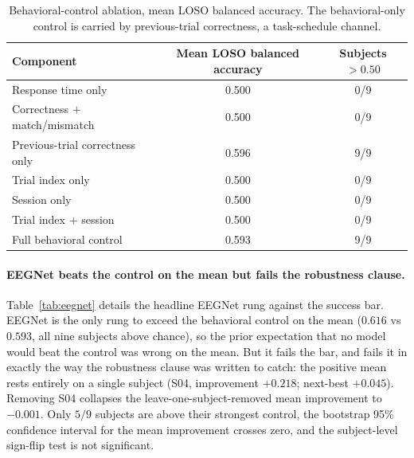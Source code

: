 \documentclass[11pt]{article}
\begin{document}
\begin{table}[h]
\centering
\caption{Behavioral-control ablation, mean LOSO balanced accuracy. The behavioral-only control is
carried by previous-trial correctness, a task-schedule channel.}
\label{tab:behavior}
\begin{tabular}{lcc}
\toprule
Component & Mean LOSO balanced accuracy & Subjects $>0.50$ \\
\midrule
Response time only & 0.500 & 0/9 \\
Correctness $+$ match/mismatch & 0.500 & 0/9 \\
Previous-trial correctness only & 0.596 & 9/9 \\
Trial index only & 0.500 & 0/9 \\
Session only & 0.500 & 0/9 \\
Trial index $+$ session & 0.500 & 0/9 \\
Full behavioral control & 0.593 & 9/9 \\
\bottomrule
\end{tabular}
\end{table}

\paragraph{EEGNet beats the control on the mean but fails the robustness clause.}
Table~\ref{tab:eegnet} details the headline EEGNet rung against the success bar. EEGNet is the only
rung to exceed the behavioral control on the mean ($0.616$ vs $0.593$, all nine subjects above
chance), so the prior expectation that no model would beat the control was wrong on the mean. But it
fails the bar, and fails it in exactly the way the robustness clause was written to catch: the
positive mean rests entirely on a single subject (S04, improvement $+0.218$; next-best $+0.045$).
Removing S04 collapses the leave-one-subject-removed mean improvement to $-0.001$. Only $5/9$
subjects are above their strongest control, the bootstrap 95\% confidence interval for the mean
improvement crosses zero, and the subject-level sign-flip test is not significant.
\end{document}
